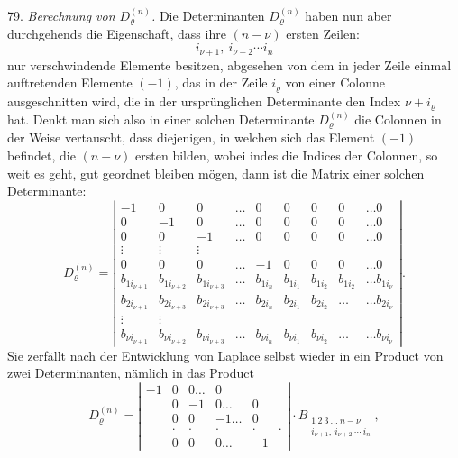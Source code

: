 79. \textit{Berechnung von $D_\varrho^{(n)}$.} Die Determinanten $D_\varrho^{(n)}$
haben nun aber durchgehends die Eigenschaft, dass ihre $(n-\nu)$ ersten
Zeilen:
\[
i_{\nu+1},\ i_{\nu+2}\cdots i_n
\]
nur verschwindende Elemente besitzen, abgesehen von dem in jeder Zeile
einmal auftretenden Elemente $(-1)$, das in der Zeile $i_\varrho$ von
einer Colonne ausgeschnitten wird, die in der urspr\"unglichen Determinante
den Index $\nu+i_\varrho$ hat. Denkt man sich also in einer solchen
Determinante $D_\varrho^{(n)}$ die Colonnen in der Weise vertauscht, dass
diejenigen, in welchen sich das Element $(-1)$ befindet, die $(n-\nu)$
ersten bilden, wobei indes die Indices der Colonnen, so weit es geht, gut
geordnet bleiben m\"ogen, dann ist die Matrix einer solchen Determinante:
\[
D_\varrho^{(n)}=
\left|\begin{array}{ccccccccc}
-1 & 0 & 0 & \ldots & 0 & 0 & 0 & 0 & \ldots 0\\
0 & -1 & 0 & \ldots & 0 & 0 & 0 & 0 & \ldots 0\\
0 & 0 & -1 & \ldots & 0 & 0 & 0 & 0 & \ldots 0\\
\vdots & \vdots & \vdots & & & & & &\\
0 & 0 & 0 & \ldots & -1 & 0 & 0 & 0 & \ldots 0\\
b_{1i_{\nu+1}} & b_{1i_{\nu+2}} & b_{1i_{\nu+3}} & \ldots & b_{1i_n} & b_{1i_1} & b_{1i_2} & b_{1i_2} & \ldots b_{1i_\nu}\\
b_{2i_{\nu+1}} & b_{2i_{\nu+3}} & b_{2i_{\nu+3}} & \ldots & b_{2i_n} & b_{2i_1} & b_{2i_2} & \ldots & \ldots b_{2i_\nu}\\
\vdots & \vdots & & & & & &\\
b_{\nu i_{\nu+1}} & b_{\nu i_{\nu+2}} & b_{\nu i_{\nu+3}} & \ldots & b_{\nu i_n} & b_{\nu i_1} & b_{\nu i_2} & \ldots & \ldots b_{\nu i_\nu}
\end{array}\right|.
\]
Sie zerf\"allt nach der Entwicklung von Laplace selbst wieder in ein
Product von zwei Determinanten, n\"amlich in das Product
\[
D_\varrho^{(n)}=
\left|\begin{array}{cccccc}
-1 & 0 & 0\ldots & 0\\
& 0 & -1 & 0\ldots & 0\\
& 0 & 0 & -1\ldots & 0\\
& \cdot & \cdot & \cdot & \cdot & \cdot\\
& 0 & 0 & 0\ldots & -1
\end{array}\right|
\cdot B_{\substack{1\ 2\ 3\ \ldots\ n-\nu\\i_{\nu+1},\ i_{\nu+2}\ \cdots\ i_n}}, \tag{D}
\]


